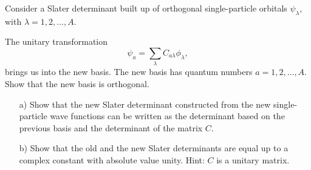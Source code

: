   \begin{prob}\label{problem:unitarity}
  Consider a Slater determinant built up of orthogonal single-particle
  orbitals $\psi_{\lambda}$, with $\lambda = 1,2,\dots,A$.

  The unitary transformation
  \[
  \psi_a = \sum_{\lambda} C_{a\lambda}\phi_{\lambda},
  \]
  brings us into the new basis.  The new basis has quantum numbers
  $a=1,2,\dots,A$.  Show that the new basis is orthogonal.
  \begin{enumerate}
  \item[a)] Show that the new Slater determinant constructed from the
    new single-particle wave functions can be written as the
    determinant based on the previous basis and the determinant of the
    matrix $C$.
  \item[b)] Show that the old and the new Slater determinants are
    equal up to a complex constant with absolute value unity.  Hint:
    $C$ is a unitary matrix.
  \end{enumerate}
  \end{prob}

